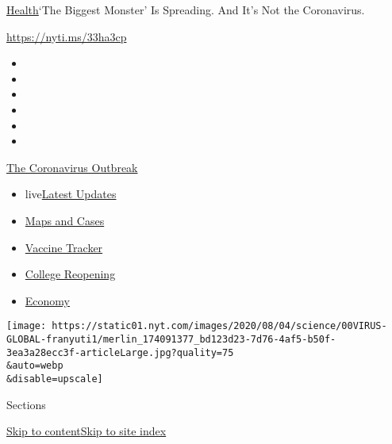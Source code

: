 \href{/section/health}{Health}\textbar{}`The Biggest Monster' Is
Spreading. And It's Not the Coronavirus.

\url{https://nyti.ms/33ha3cp}

\begin{itemize}
\item
\item
\item
\item
\item
\item
\end{itemize}

\href{https://www.nytimes.com/news-event/coronavirus?action=click\&pgtype=Article\&state=default\&region=TOP_BANNER\&context=storylines_menu}{The
Coronavirus Outbreak}

\begin{itemize}
\tightlist
\item
  live\href{https://www.nytimes.com/2020/08/04/world/coronavirus-cases.html?action=click\&pgtype=Article\&state=default\&region=TOP_BANNER\&context=storylines_menu}{Latest
  Updates}
\item
  \href{https://www.nytimes.com/interactive/2020/us/coronavirus-us-cases.html?action=click\&pgtype=Article\&state=default\&region=TOP_BANNER\&context=storylines_menu}{Maps
  and Cases}
\item
  \href{https://www.nytimes.com/interactive/2020/science/coronavirus-vaccine-tracker.html?action=click\&pgtype=Article\&state=default\&region=TOP_BANNER\&context=storylines_menu}{Vaccine
  Tracker}
\item
  \href{https://www.nytimes.com/2020/08/02/us/covid-college-reopening.html?action=click\&pgtype=Article\&state=default\&region=TOP_BANNER\&context=storylines_menu}{College
  Reopening}
\item
  \href{https://www.nytimes.com/live/2020/08/04/business/stock-market-today-coronavirus?action=click\&pgtype=Article\&state=default\&region=TOP_BANNER\&context=storylines_menu}{Economy}
\end{itemize}

\texttt{[image: https://static01.nyt.com/images/2020/08/04/science/00VIRUS-GLOBAL-franyuti1/merlin\_174091377\_bd123d23-7d76-4af5-b50f-3ea3a28ecc3f-articleLarge.jpg?quality=75\\\&auto=webp\\\&disable=upscale]}

Sections

\protect\hyperlink{site-content}{Skip to
content}\protect\hyperlink{site-index}{Skip to site index}

